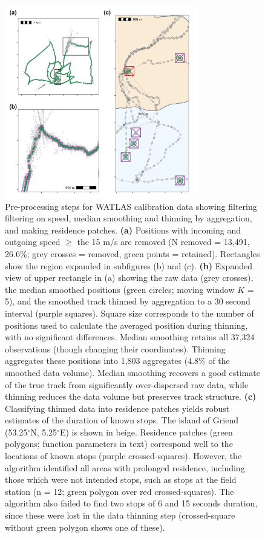 \documentclass[10pt,paper=a4,headings=standardclasses
]{scrartcl}
\begin{document}
\begin{figure}[h!]
    \centering
    \includegraphics[width=0.75\textwidth]{figures/fig_06_calib_residence_patch.png}
    \caption{Pre-processing steps for WATLAS calibration data showing filtering filtering on speed, median smoothing and thinning by aggregation, and making residence patches.
    \textbf{(a)} Positions with incoming and outgoing speed $\geq$ the 15 m/s are removed (N removed = 13,491, 26.6\%; grey crosses = removed, green points = retained).
    Rectangles show the region expanded in subfigures (b) and (c).
    \textbf{(b)} Expanded view of upper rectangle in (a) showing the raw data (grey crosses), the median smoothed positions (green circles; moving window $K$ = 5), and the smoothed track thinned by aggregation to a 30 second interval (purple squares).
    Square size corresponds to the number of positions used to calculate the averaged position during thinning, with no significant differences.
    Median smoothing retains all 37,324 observations (though changing their coordinates). Thinning aggregates these positions into 1,803 aggregates (4.8\% of the smoothed data volume).
    Median smoothing recovers a good estimate of the true track from significantly over-dispersed raw data, while thinning reduces the data volume but preserves track structure.
    \textbf{(c)} Classifying thinned data into residence patches yields robust estimates of the duration of known stops. The island of Griend (53.25$^{\circ}$N, 5.25$^{\circ}$E) is shown in beige.
    Residence patches (green polygons; function parameters in text) correspond well to the locations of known stops (purple crossed-squares).
    However, the algorithm identified all areas with prolonged residence, including those which were not intended stops, such as stops at the field station (n = 12; green polygon over red crossed-squares).
    The algorithm also failed to find two stops of 6 and 15 seconds duration, since these were lost in the data thinning step (crossed-square without green polygon shows one of these).}
    \label{fig:figure_calibration}
\end{figure}
\end{document}
